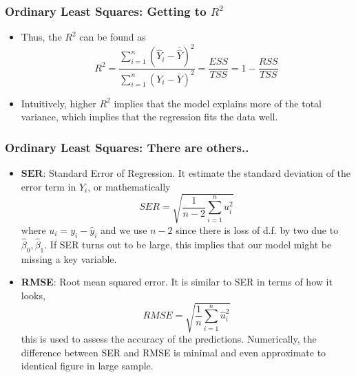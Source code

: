\documentclass[aspectratio=169]{beamer}
\begin{document}
\begin{frame}
\frametitle{Ordinary Least Squares: Getting to $R^2$}
\begin{itemize}
\item Thus, the $R^2$ can be found as
\[
R^2 = \frac{\sum_{i=1}^n (\hat{Y}_i - \bar{\hat{Y}})^2}{\sum_{i=1}^n (Y_i-\bar{Y})^2} = \frac{ESS}{TSS} = 1-\frac{RSS}{TSS}
\]
\item Intuitively, higher $R^2$ implies that the model explains more of the total variance, which implies that the regression fits the data well. 
\end{itemize}
\end{frame}


\begin{frame}
\frametitle{Ordinary Least Squares: There are others..}
\begin{itemize}
\item  $\mathbf{SER}$: Standard Error of Regression. It estimate the standard deviation of the error term in $Y_i$, or mathematically
\[
SER = \sqrt{\frac{1}{n-2}\sum_{i=1}^n u_i^2}
\]
where $u_i = y_i-\hat{y}_i$ and we use $n-2$ since there is loss of d.f. by two due to $\hat{\beta}_0, \hat{\beta}_1$. If SER turns out to be large, this implies that our model might be missing a key variable.
 \item \textbf{RMSE}: Root mean squared error. It is similar to SER in terms of how it looks, 
\[
RMSE = \sqrt{\frac{1}{n}\sum_{i=1}^n \hat{u}_i^2}
\]
this is used to assess the accuracy of the predictions. Numerically, the difference between SER and RMSE is minimal and even approximate to identical figure in large sample. 

\end{itemize}
\end{frame}
\end{document}
